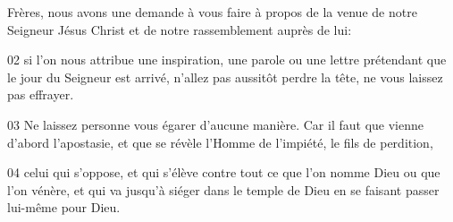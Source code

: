 Frères, nous avons une demande à vous faire à propos de la venue de notre Seigneur Jésus Christ et de notre rassemblement auprès de lui:

02 si l'on nous attribue une inspiration, une parole ou une lettre prétendant que le jour du Seigneur est arrivé, n'allez pas aussitôt perdre la tête, ne vous laissez pas effrayer.

03 Ne laissez personne vous égarer d’aucune manière. Car il faut que vienne d’abord l’apostasie, et que se révèle l’Homme de l’impiété, le fils de perdition,

04 celui qui s’oppose, et qui s’élève contre tout ce que l’on nomme Dieu ou que l’on vénère, et qui va jusqu’à siéger dans le temple de Dieu en se faisant passer lui-même pour Dieu.